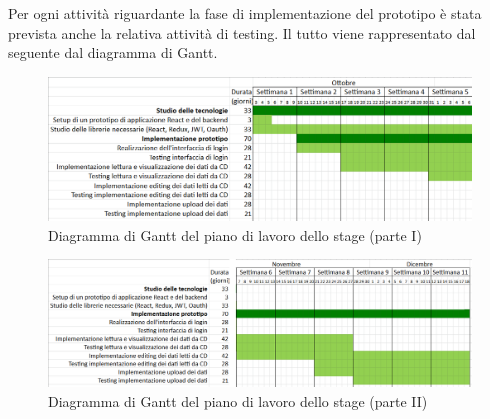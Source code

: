 Per ogni attività riguardante la fase di implementazione del prototipo è stata prevista anche la relativa attività di testing.
Il tutto viene rappresentato dal seguente dal diagramma di Gantt.
\begin{figure}[H]
  \centering
  \includegraphics[width=\textwidth]{immagini/gannt1.png}
  \caption{Diagramma di Gantt del piano di lavoro dello stage (parte I)}
\end{figure}
\begin{figure}[H]
  \centering
  \includegraphics[width=\textwidth]{immagini/gantt2.png}
  \caption{Diagramma di Gantt del piano di lavoro dello stage (parte II)}
\end{figure}
